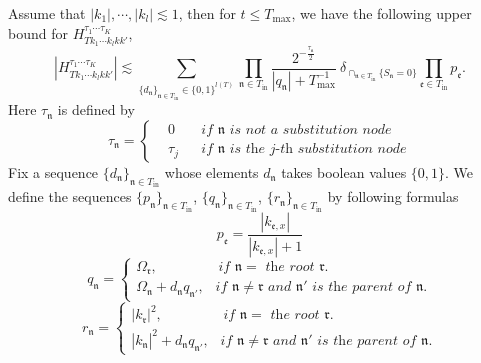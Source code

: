 \begin{lem}\label{lem.boundcoefoperator}
Assume that $|k_1|, \cdots, |k_{l}|\lesssim 1$, then for $t\le  T_{\text{max}}$, we have the following upper bound for $H^{\tau_1\cdots \tau_{K}}_{Tk_1\cdots k_{l}kk'}$,
\begin{equation}\label{eq.boundcoefoperator.threewave}
    |H^{\tau_1\cdots \tau_{K}}_{Tk_1\cdots k_{l}kk'}|\lesssim \sum_{\{d_{\mathfrak{n}}\}_{\mathfrak{n}\in T_{\text{in}}}\in\{0,1\}^{l(T)}}\prod_{\mathfrak{n}\in T_{\text{in}}}\frac{2^{-\frac{\tau_{\mathfrak{n}}}{2}}}{|q_{\mathfrak{n}}|+T^{-1}_{\text{max}}}\ \delta_{\cap_{\mathfrak{n}\in T_{\text{in}}} \{S_{\mathfrak{n}}=0\}} \prod_{\mathfrak{e}\in T_{\text{in}}} p_{\mathfrak{e}}.
\end{equation}
Here $\tau_{\mathfrak{n}}$ is defined by 
\begin{equation}
   \tau_{\mathfrak{n}}=\left\{
    \begin{aligned}
        &0 && \textit{if $\mathfrak{n}$ is not a substitution node}
        \\
        &\tau_j  &&\textit{if $\mathfrak{n}$ is the $j$-th substitution node}
    \end{aligned}\right.
\end{equation}
Fix a sequence $\{d_{\mathfrak{n}}\}_{\mathfrak{n}\in T_{\text{in}}}$ whose elements $d_{\mathfrak{n}}$ takes boolean values $\{0,1\}$. We define the sequences $\{p_{\mathfrak{n}}\}_{\mathfrak{n}\in T_{\text{in}}}$, $\{q_{\mathfrak{n}}\}_{\mathfrak{n}\in T_{\text{in}}}$, $\{r_{\mathfrak{n}}\}_{\mathfrak{n}\in T_{\text{in}}}$ by following formulas
\begin{equation}\label{eq.p_noperator.threewave}
    p_{\mathfrak{e}}=\frac{|k_{\mathfrak{e},x}|}{|k_{\mathfrak{e},x}|+1}
\end{equation}
\begin{equation}\label{eq.q_noperator.threewave}
    q_{\mathfrak{n}}=
    \begin{cases}
    \Omega_{\mathfrak{r}}, \qquad\qquad \textit{ if $\mathfrak{n}=$ the root $\mathfrak{r}$.}
    \\
    \Omega_{\mathfrak{n}}+d_{\mathfrak{n}}q_{\mathfrak{n}'},\ \ \textit{ if $\mathfrak{n}\neq\mathfrak{r}$ and $\mathfrak{n}'$ is the parent of $\mathfrak{n}$.}
    \end{cases}
\end{equation}
\begin{equation}\label{eq.r_noperator.threewave}
    r_{\mathfrak{n}}=
    \begin{cases}
    |k_{\mathfrak{r}}|^2, \qquad\qquad \textit{ if $\mathfrak{n}=$ the root $\mathfrak{r}$.}
    \\
    |k_{\mathfrak{n}}|^2+d_{\mathfrak{n}}q_{\mathfrak{n}'},\ \ \textit{ if $\mathfrak{n}\neq\mathfrak{r}$ and $\mathfrak{n}'$ is the parent of $\mathfrak{n}$.}
    \end{cases}
\end{equation}


\end{lem}
